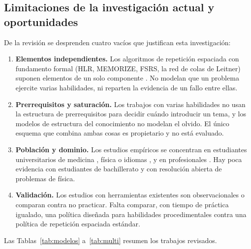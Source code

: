\documentclass[12pt]{article}
\theoremstyle{definition}
\begin{document}
\subsection{Limitaciones de la investigación actual y oportunidades}

De la revisión se desprenden cuatro vacíos que justifican esta investigación:

\begin{enumerate}
\item \textbf{Elementos independientes.} Los algoritmos de repetición espaciada con fundamento formal (HLR, MEMORIZE, FSRS, la red de colas de Leitner) suponen elementos de un solo componente \citep{settles2016,tabibian2019,ye2022,reddy2016}. No modelan que un problema ejercite varias habilidades, ni reparten la evidencia de un fallo entre ellas.

\item \textbf{Prerrequisitos y saturación.} Los trabajos con varias habilidades \citep{choffin2019,choffin2021} no usan la estructura de prerrequisitos para decidir cuándo introducir un tema, y los modelos de estructura del conocimiento \citep{doignon1985} no modelan el olvido. El único esquema que combina ambas cosas \citep{skycak2023} es propietario y no está evaluado.

\item \textbf{Población y dominio.} Los estudios empíricos se concentran en estudiantes universitarios de medicina \citep{gilbert2023,jape2022}, física \citep{voice2020} o idiomas \citep{hanson2020}, y en profesionales \citep{price2025}. Hay poca evidencia con estudiantes de bachillerato y con resolución abierta de problemas de física.

\item \textbf{Validación.} Los estudios con herramientas existentes son observacionales o comparan contra no practicar. Falta comparar, con tiempo de práctica igualado, una política diseñada para habilidades procedimentales contra una política de repetición espaciada estándar.
\end{enumerate}

Las Tablas~\ref{tab:modelos} a~\ref{tab:multi} resumen los trabajos revisados.
\end{document}
